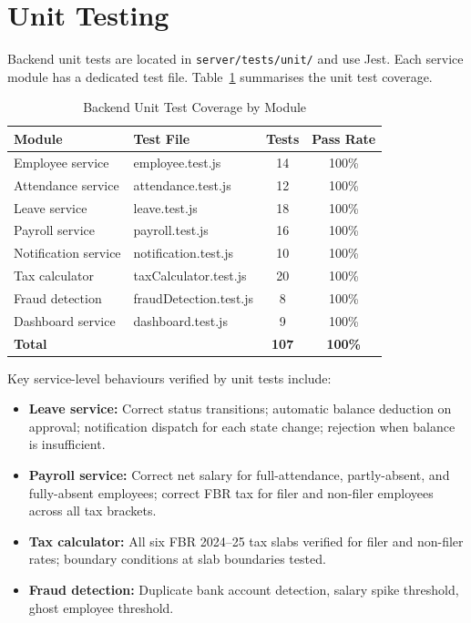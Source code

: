 \documentclass[12pt,a4paper]{report}
\begin{document}
\section{Unit Testing}

Backend unit tests are located in \texttt{server/tests/unit/} and use Jest. Each service module has a dedicated test file. Table~\ref{tab:unit_tests} summarises the unit test coverage.

\begin{table}[H]
\centering
\caption{Backend Unit Test Coverage by Module}
\label{tab:unit_tests}
\begin{tabular}{|l|l|c|c|}
\hline
\textbf{Module} & \textbf{Test File} & \textbf{Tests} & \textbf{Pass Rate} \\
\hline
Employee service    & employee.test.js     & 14 & 100\% \\
\hline
Attendance service  & attendance.test.js   & 12 & 100\% \\
\hline
Leave service       & leave.test.js        & 18 & 100\% \\
\hline
Payroll service     & payroll.test.js      & 16 & 100\% \\
\hline
Notification service & notification.test.js & 10 & 100\% \\
\hline
Tax calculator      & taxCalculator.test.js & 20 & 100\% \\
\hline
Fraud detection     & fraudDetection.test.js & 8 & 100\% \\
\hline
Dashboard service   & dashboard.test.js    & 9  & 100\% \\
\hline
\textbf{Total}      &                      & \textbf{107} & \textbf{100\%} \\
\hline
\end{tabular}
\end{table}

Key service-level behaviours verified by unit tests include:

\begin{itemize}
    \item \textbf{Leave service:} Correct status transitions; automatic balance deduction on approval; notification dispatch for each state change; rejection when balance is insufficient.
    \item \textbf{Payroll service:} Correct net salary for full-attendance, partly-absent, and fully-absent employees; correct FBR tax for filer and non-filer employees across all tax brackets.
    \item \textbf{Tax calculator:} All six FBR 2024--25 tax slabs verified for filer and non-filer rates; boundary conditions at slab boundaries tested.
    \item \textbf{Fraud detection:} Duplicate bank account detection, salary spike threshold, ghost employee threshold.
\end{itemize}
\end{document}

